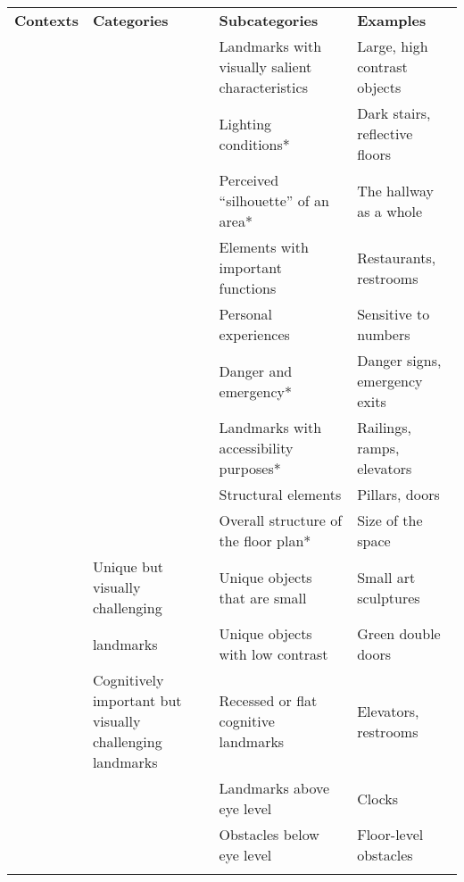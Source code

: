 \begin{table*}[h]
\centering
\small 
\begin{tabular}{>{\raggedright\arraybackslash\color{brownishred}}m{2.8cm} >{\raggedright\arraybackslash\color{brownishred}}m{4.3cm} >{\raggedright\arraybackslash\color{brownishred}}m{5.8cm} >{\raggedright\arraybackslash\color{brownishred}}m{3.4cm}}
\Xhline{2\arrayrulewidth}
\textbf{Contexts} & \textbf{Categories} & \textbf{Subcategories} &\textbf{Examples}\\
\Xhline{2\arrayrulewidth}
\multirow{9}{*}{Real-world Landmarks}& \multirow{3}{*}{Visual Landmarks}&Landmarks with visually salient characteristics \cite{sorrows1999nature} & Large, high contrast objects\\
\cline{3-4}
& &Lighting conditions* & Dark stairs, reflective floors\\
\cline{3-4}
& &Perceived ``silhouette'' of an area* &The hallway as a whole\\
\cline{2-4}
& \multirow{4}{*}{Cognitive Landmarks}& Elements with important functions \cite{raubal2002enriching}&Restaurants, restrooms\\
\cline{3-4}
& &Personal experiences \cite{sorrows1999nature}&Sensitive to numbers\\
\cline{3-4}
& &Danger and emergency* &Danger signs, emergency exits\\
\cline{3-4}
& &Landmarks with accessibility purposes*&Railings, ramps, elevators\\
\cline{2-4}
& \multirow{2}{*}{Structural Landmarks}&Structural elements \cite{sorrows1999nature}&Pillars, doors\\
\cline{3-4}
& &Overall structure of the floor plan*&Size of the space\\
\hline
\multirow{6}{*}{AR Landmarks}& Unique but visually challenging &Unique objects that are small&Small art sculptures\\
\cline{3-4}
&   landmarks& Unique objects with low contrast& Green double doors\\
\cline{2-4}

& Cognitively important but visually challenging landmarks& Recessed or flat cognitive landmarks & Elevators, restrooms\\
\cline{2-4}
& \multirow{2}{*}{Landmarks outside field of view}&Landmarks above eye level &Clocks\\
\cline{3-4}
&&Obstacles below eye level&Floor-level obstacles\\
\Xhline{2\arrayrulewidth}
\end{tabular}
\caption{}
\label{tab:landmark_taxonomies}
\end{table*}
